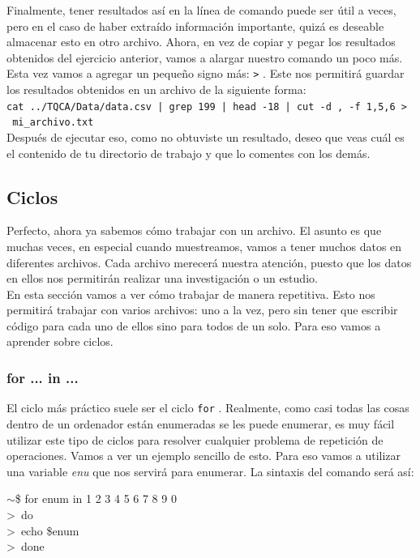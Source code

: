 \documentclass[10pt,letterpaper]{article}
\newcommand{\inlinecode}[1]{
\colorbox{light-gray}{\texttt{#1}}
}
\newenvironment{Code}
{
\begin{lrbox}{\selvestebox}%
\begin{minipage}{\dimexpr\columnwidth-2\fboxsep\relax}
\fontfamily{\ttdefault}\selectfont
}
{\end{minipage}\end{lrbox}%
\begin{center}
\colorbox{light-gray}{\usebox{\selvestebox}}
\end{center}
}
\begin{document}
Finalmente, tener resultados as\'i en la l\'inea de comando puede ser \'util a veces, pero en el caso de haber extra\'ido informaci\'on importante, quiz\'a es deseable almacenar esto en otro archivo. Ahora, en vez de copiar y pegar los resultados obtenidos del ejercicio anterior, vamos a alargar nuestro comando un poco m\'as. Esta vez vamos a agregar un peque\~no signo m\'as: \inlinecode{>}. Este nos permitir\'a guardar los resultados obtenidos en un archivo de la siguiente forma:\\
\inlinecode{cat ../TQCA/Data/data.csv | grep 199 | head -18 | cut -d , -f 1,5,6 > \ mi\_archivo.txt}\\
Despu\'es de ejecutar eso, como no obtuviste un resultado, deseo que veas cu\'al es el contenido de tu directorio de trabajo y que lo comentes con los dem\'as.

\subsection{Ciclos}
Perfecto, ahora ya sabemos c\'omo trabajar con un archivo. El asunto es que muchas veces, en especial cuando muestreamos, vamos a tener muchos datos en diferentes archivos. Cada archivo merecer\'a nuestra atenci\'on, puesto que los datos en ellos nos permitir\'an realizar una investigaci\'on o un estudio.\\

En esta secci\'on vamos a ver c\'omo trabajar de manera repetitiva. Esto nos permitir\'a trabajar con varios archivos: uno a la vez, pero sin tener que escribir c\'odigo para cada uno de ellos sino para todos de un solo. Para eso vamos a aprender sobre ciclos.

\subsubsection{for ... in ...}
El ciclo m\'as pr\'actico suele ser el ciclo \inlinecode{for}. Realmente, como casi todas las cosas dentro de un ordenador est\'an enumeradas se les puede enumerar, es muy f\'acil utilizar este tipo de ciclos para resolver cualquier problema de repetici\'on de operaciones. Vamos a ver un ejemplo sencillo de esto. Para eso vamos a utilizar una variable \emph{enu} que nos servir\'a para enumerar. La sintaxis del comando ser\'a as\'i:
\begin{Code}
$\sim$\$ for enum in 1 2 3 4 5 6 7 8 9 0\\
>\ do\\
>\ echo \$enum\\
>\ done
\end{Code}
\end{document}
